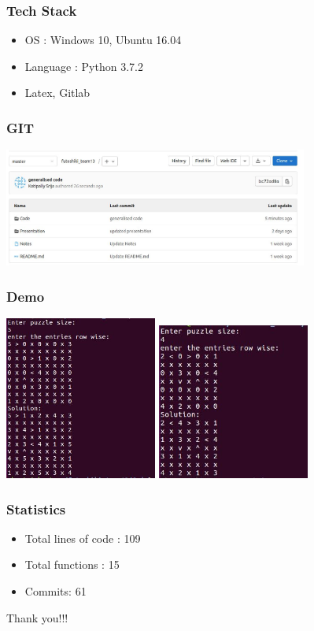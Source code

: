 \documentclass[14pt]{beamer}
\begin{document}
    \begin{frame}
        \frametitle{Tech Stack}
        \begin{itemize}
           \item OS : Windows 10, Ubuntu 16.04
           \item Language : Python 3.7.2
           \item Latex, Gitlab
        \end{itemize}
    \end{frame}
    \begin{frame}
         \frametitle{GIT}
              \includegraphics[width=10cm]{git_img.jpeg}
    \end{frame}
    \begin{frame}
         \frametitle{Demo}
             \vspace{0.1in}
             \includegraphics[width=5cm]{output1.jpeg}
             \vspace{1.3in}
             \includegraphics[width=5cm]{output2.jpeg}
    \end{frame}
    \begin{frame}
         \frametitle{Statistics}
            \begin{itemize}
               \item Total lines of code : 109
               \item Total functions : 15
               \item Commits: 61
            \end{itemize}
    \end{frame}
    \begin{frame}
        \begin{center}
             Thank you!!!
        \end{center}
    \end{frame}
\end{document}

